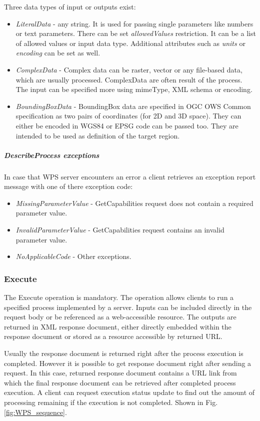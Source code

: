 \documentclass[12pt,a4paper]{article}
\begin{document}
\newpage
\noindent
Three data types of input or outputs exist:
\begin{itemize}
\item\textit{LiteralData} - any string. It is used for passing single parameters like numbers or text parameters. There can be set
\textit{allowedValues} restriction. It can be a list of allowed values or input data type. Additional attributes such as \textit{units}
or \textit{encoding} can be set as well. 
\item\textit{ComplexData} - Complex data can be raster, vector or any file-based data, which are usually processed. ComplexData 
are often result of the process. The input can be specified more using mimeType, XML schema or encoding.
\item\textit{BoundingBoxData} - BoundingBox data are specified in OGC OWS Common specification as two pairs of coordinates (for 2D and 3D space). They can either be encoded in WGS84 or EPSG code can be passed too. They are intended to be used as definition of the target region.
\end{itemize}

\subparagraph{DescribeProcess exceptions}
In case that WPS server encounters an error a client retrieves an exception report message with one of there exception code:
\begin{itemize}
\item\textit{MissingParameterValue} - GetCapabilities request does not contain a required parameter value.
\item\textit{InvalidParameterValue} - GetCapabilities request contains an invalid parameter value.
\item\textit{NoApplicableCode} - Other exceptions.
\end{itemize}

\subsubsection{Execute}
The Execute operation is mandatory. The operation allows clients to run a specified process implemented by a server.
Inputs can be included directly in the request body or be referenced as a web-accessible resource. The outputs are returned
in XML response document, either directly embedded within the response document or stored as a resource accessible by
returned URL.

Usually the response document is returned right after the process execution is completed. However it is possible to get
response document right after sending a request. In this case, returned response document contains a URL link from which the
final response document can be retrieved after completed process execution. A client can request execution status update to
find out the amount of processing remaining if the execution is not completed. Shown in Fig. \ref{fig:WPS_sequence}.
\end{document}
